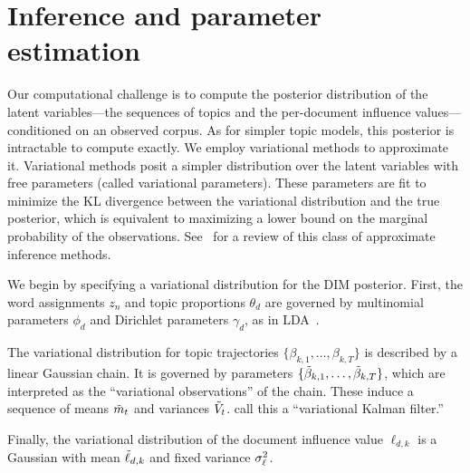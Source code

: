\vspace{-2pt}
\section{Inference and parameter estimation}
\label{section:inference}

Our computational challenge is to compute the posterior distribution
of the latent variables---the sequences of topics and the per-document
influence values---conditioned on an observed corpus.  As for simpler
topic models, this posterior is intractable to compute exactly. We
employ variational methods to approximate it. Variational methods
posit a simpler distribution over the latent variables with free
parameters (called variational parameters).  These parameters are fit
to minimize the KL divergence between the variational distribution and
the true posterior, which is equivalent to maximizing a lower bound on
the marginal probability of the observations. See~\cite{jordan:1999} %
for a review of this class of approximate inference methods.

We begin by specifying a variational distribution for the DIM
posterior.  First, the word assignments $z_n$ and topic proportions
$\theta_d$ are governed by multinomial parameters $\phi_d$ and
Dirichlet parameters $\gamma_d$, as in LDA~\cite{blei:2003}.   %

The variational distribution for topic trajectories
$\{\beta_{k,1}, \ldots, \beta_{k,T} \}$ is described by a linear
Gaussian chain.  It is governed by parameters $\{ \tilde{\beta}_{k,1}, \ldots,
\tilde{\beta}_{k,T} \}$, which are interpreted as the ``variational
observations'' of the chain.  These induce a sequence of means $\tilde{m}_t$
and variances $\tilde{V}_t$. \cite{blei:2006} call this a ``variational   %
Kalman filter.''

Finally, the variational distribution of the document influence value
$\ell_{d,k}$ is a Gaussian with mean $\tilde{\ell}_{d,k}$ and fixed variance
$\sigma^2_{\ell}$.




